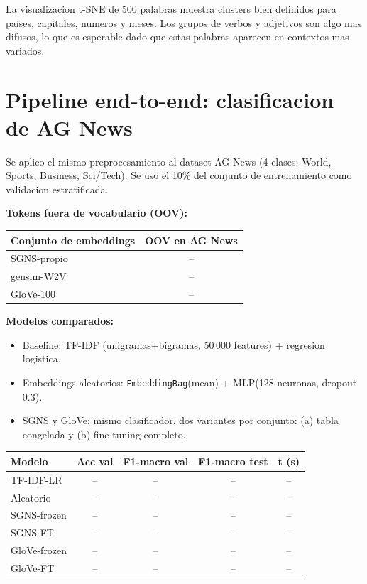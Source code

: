 \documentclass[11pt,a4paper]{article}
\begin{document}
La visualizacion t-SNE de 500 palabras muestra clusters bien definidos para
paises, capitales, numeros y meses. Los grupos de verbos y adjetivos son
algo mas difusos, lo que es esperable dado que estas palabras aparecen en
contextos mas variados.

\section{Pipeline end-to-end: clasificacion de AG News}

Se aplico el mismo preprocesamiento al dataset AG News (4 clases: World, Sports,
Business, Sci/Tech). Se uso el 10\% del conjunto de entrenamiento como validacion
estratificada.

\textbf{Tokens fuera de vocabulario (OOV):}

\begin{center}
\small
\begin{tabular}{lc}
\toprule
Conjunto de embeddings & OOV en AG News \\
\midrule
SGNS-propio            & -- \\
gensim-W2V             & -- \\
GloVe-100              & -- \\
\bottomrule
\end{tabular}
\end{center}

\textbf{Modelos comparados:}
\begin{itemize}
\item Baseline: TF-IDF (unigramas+bigramas, 50\,000 features) + regresion logistica.
\item Embeddings aleatorios: \texttt{EmbeddingBag}(mean) + MLP(128 neuronas, dropout 0.3).
\item SGNS y GloVe: mismo clasificador, dos variantes por conjunto: (a) tabla congelada
      y (b) fine-tuning completo.
\end{itemize}

\begin{center}
\small
\begin{tabular}{lcccc}
\toprule
Modelo & Acc val & F1-macro val & F1-macro test & t (s) \\
\midrule
TF-IDF-LR    & -- & -- & -- & -- \\
Aleatorio    & -- & -- & -- & -- \\
SGNS-frozen  & -- & -- & --  & -- \\
SGNS-FT      & -- & -- & -- & -- \\
GloVe-frozen & -- & -- & -- & -- \\
GloVe-FT     & -- & -- & -- & -- \\
\bottomrule
\end{tabular}
\end{center}
\end{document}
